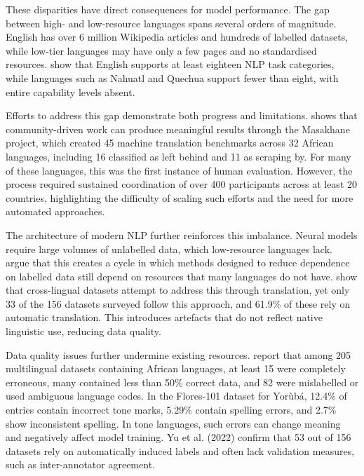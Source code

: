 \documentclass[12pt]{ThesisRU}
\begin{document}
These disparities have direct consequences for model performance. The gap between high- and low-resource languages spans several orders of magnitude. English has over 6 million Wikipedia articles and hundreds of labelled datasets, while low-tier languages may have only a few pages and no standardised resources. \citet{hedderich2021survey} show that English supports at least eighteen NLP task categories, while languages such as Nahuatl and Quechua support fewer than eight, with entire capability levels absent.

Efforts to address this gap demonstrate both progress and limitations. \citet{nekoto2020participatory} shows that community-driven work can produce meaningful results through the Masakhane project, which created 45 machine translation benchmarks across 32 African languages, including 16 classified as left behind and 11 as scraping by. For many of these languages, this was the first instance of human evaluation. However, the process required sustained coordination of over 400 participants across at least 20 countries, highlighting the difficulty of scaling such efforts and the need for more automated approaches.

The architecture of modern NLP further reinforces this imbalance. Neural models require large volumes of unlabelled data, which low-resource languages lack. \citet{joshi2020state} argue that this creates a cycle in which methods designed to reduce dependence on labelled data still depend on resources that many languages do not have. \citet{yu2022beyond} show that cross-lingual datasets attempt to address this through translation, yet only 33 of the 156 datasets surveyed follow this approach, and 61.9\% of these rely on automatic translation. This introduces artefacts that do not reflect native linguistic use, reducing data quality.

Data quality issues further undermine existing resources. \citet{adebara2022towards} report that among 205 multilingual datasets containing African languages, at least 15 were completely erroneous, many contained less than 50\% correct data, and 82 were mislabelled or used ambiguous language codes. In the Flores-101 dataset for Yorùbá, 12.4\% of entries contain incorrect tone marks, 5.29\% contain spelling errors, and 2.7\% show inconsistent spelling. In tone languages, such errors can change meaning and negatively affect model training. Yu et al. (2022) confirm that 53 out of 156 datasets rely on automatically induced labels and often lack validation measures, such as inter-annotator agreement.
\end{document}
